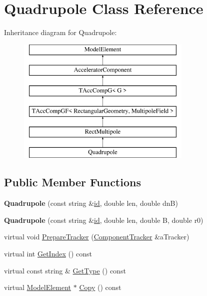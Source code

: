 \hypertarget{classQuadrupole}{}\section{Quadrupole Class Reference}
\label{classQuadrupole}
Inheritance diagram for Quadrupole\+:\begin{figure}[H]
\begin{center}
\leavevmode
\includegraphics[height=6.000000cm]{classQuadrupole}
\end{center}
\end{figure}
\subsection*{Public Member Functions}
\begin{DoxyCompactItemize}
\item 
\mbox{\label{classQuadrupole_ad8be73280b12fb42aab05fb1f05ca510}} 
{\bfseries Quadrupole} (const string \&\hyperlink{classModelElement_aada171ead2085c75b592cf07d91bc5c2}{id}, double len, double dnB)
\item 
\mbox{\label{classQuadrupole_a48b3e930b6d89db34feac2e44083eb10}} 
{\bfseries Quadrupole} (const string \&\hyperlink{classModelElement_aada171ead2085c75b592cf07d91bc5c2}{id}, double len, double B, double r0)
\item 
virtual void \hyperlink{classQuadrupole_aa0160bdc8c7be3d48e400a9698907b15}{Prepare\+Tracker} (\hyperlink{classComponentTracker}{Component\+Tracker} \&a\+Tracker)
\item 
virtual int \hyperlink{classQuadrupole_a39b9e323df34c8db56f6daaaa112cf06}{Get\+Index} () const
\item 
virtual const string \& \hyperlink{classQuadrupole_aa8d08b76a82688cbb9161b120114faff}{Get\+Type} () const
\item 
virtual \hyperlink{classModelElement}{Model\+Element} $\ast$ \hyperlink{classQuadrupole_aed92f774f225e5dbc2b88d3f928d6d9e}{Copy} () const
\end{DoxyCompactItemize}
